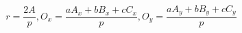 \documentclass[12pt]{article}
\begin{document}
\[
    r = \frac{2A}{p}, O_x = \frac{aA_x + bB_x + cC_x}{p}, O_y = \frac{aA_y + bB_y + cC_y}{p}
\]
\end{document}
